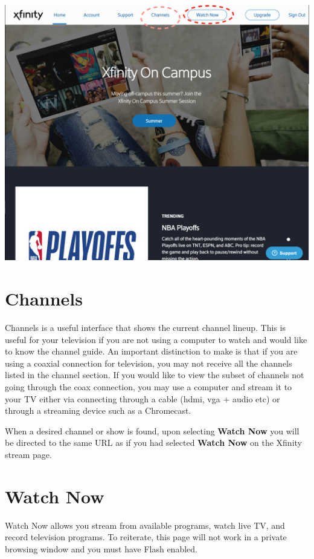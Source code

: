 \documentclass[a4paper, 11pt]{article}
\begin{document}
\includegraphics[width=\linewidth, keepaspectratio]{home.png}
\section*{
  Channels 
}

Channels is a useful interface that shows the current channel lineup.  This 
is useful for your television if you are not using a computer to watch and
would like to know the channel guide.  An important distinction to make is 
that if you are using a coaxial connection for television, you may not
receive all the channels listed in the channel section.  If you would like to
view the subset of channels not going through the coax connection, you may
use a computer and stream it to your TV either via connecting through a 
cable (hdmi, vga + audio etc) or through a streaming device such as a Chromecast.

When a desired channel or show is found, upon selecting \textbf{Watch Now} you
will be directed to the same URL as if you had selected \textbf{Watch Now} on
the Xfinity stream page.

\section*{
  Watch Now
}

Watch Now allows you stream from available programs, watch live TV, and record television programs.  To reiterate, this page will not work in a private 
browsing window and you must have Flash enabled.  
\end{document}
